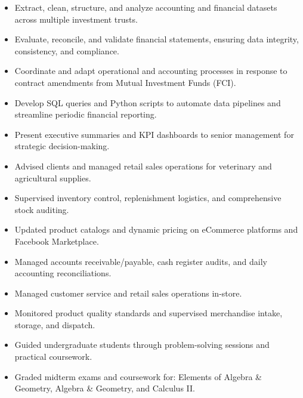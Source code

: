\documentclass[english]{CV_template}
\begin{document}
\begin{itemize}
    \item Extract, clean, structure, and analyze accounting and financial datasets across multiple investment trusts.
    \item Evaluate, reconcile, and validate financial statements, ensuring data integrity, consistency, and compliance.
    \item Coordinate and adapt operational and accounting processes in response to contract amendments from Mutual Investment Funds (FCI).
    \item Develop SQL queries and Python scripts to automate data pipelines and streamline periodic financial reporting.
    \item Present executive summaries and KPI dashboards to senior management for strategic decision-making.
\end{itemize}

\begin{itemize}
    \item Advised clients and managed retail sales operations for veterinary and agricultural supplies.
    \item Supervised inventory control, replenishment logistics, and comprehensive stock auditing.
    \item Updated product catalogs and dynamic pricing on eCommerce platforms and Facebook Marketplace.
    \item Managed accounts receivable/payable, cash register audits, and daily accounting reconciliations.
\end{itemize}

\begin{itemize}
    \item Managed customer service and retail sales operations in-store.
    \item Monitored product quality standards and supervised merchandise intake, storage, and dispatch.
\end{itemize}

\begin{itemize}
    \item Guided undergraduate students through problem-solving sessions and practical coursework.
    \item Graded midterm exams and coursework for: Elements of Algebra \& Geometry, Algebra \& Geometry, and Calculus II.
\end{itemize}
\end{document}
